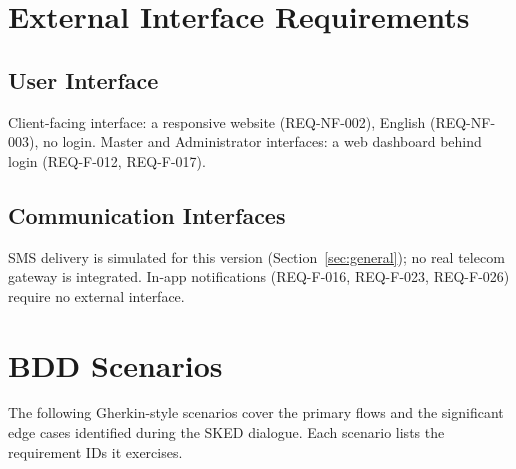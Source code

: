 \documentclass[11pt,a4paper]{article}
\begin{document}
\section{External Interface Requirements}

\subsection{User Interface}
Client-facing interface: a responsive website (REQ-NF-002), English
(REQ-NF-003), no login. Master and Administrator interfaces: a web
dashboard behind login (REQ-F-012, REQ-F-017).

\subsection{Communication Interfaces}
SMS delivery is simulated for this version (Section~\ref{sec:general}); no
real telecom gateway is integrated. In-app notifications (REQ-F-016,
REQ-F-023, REQ-F-026) require no external interface.

\section{BDD Scenarios}
\label{sec:bdd}

The following Gherkin-style scenarios cover the primary flows and the
significant edge cases identified during the SKED dialogue. Each scenario
lists the requirement IDs it exercises.
\end{document}
